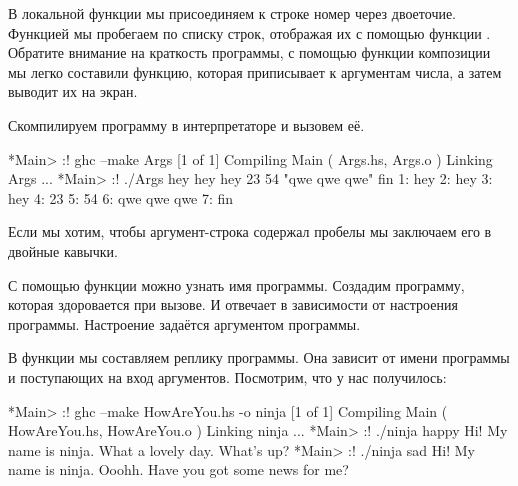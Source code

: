 В локальной функции  мы присоединяем к строке номер через
двоеточие. Функцией  мы пробегаем по списку строк, отображая
их с помощью функции . Обратите внимание на краткость
программы, с помощью функции композиции мы легко составили функцию,
которая приписывает к аргументам числа, а затем выводит их на экран.

Скомпилируем программу в интерпретаторе и вызовем её.


\begin{code}
*Main> :! ghc --make Args
[1 of 1] Compiling Main             ( Args.hs, Args.o )
Linking Args ...
*Main> :! ./Args hey hey hey 23 54 "qwe qwe qwe" fin
1: hey
2: hey
3: hey
4: 23
5: 54
6: qwe qwe qwe
7: fin
\end{code}

Если мы хотим, чтобы аргумент-строка содержал пробелы мы заключаем его в
двойные кавычки.

С помощью функции  можно узнать имя программы. Создадим
программу, которая здоровается при вызове. И отвечает в зависимости от
настроения программы. Настроение задаётся аргументом программы.



В функции  мы составляем реплику программы. Она зависит от
имени программы и поступающих на вход аргументов. Посмотрим, что у нас
получилось:


\begin{code}
*Main> :! ghc --make HowAreYou.hs -o ninja 
[1 of 1] Compiling Main             ( HowAreYou.hs, HowAreYou.o )
Linking ninja ...
*Main> :! ./ninja happy
Hi! My name is ninja.
What a lovely day. What's up?
*Main> :! ./ninja sad
Hi! My name is ninja.
Ooohh. Have you got some news for me?
\end{code}

